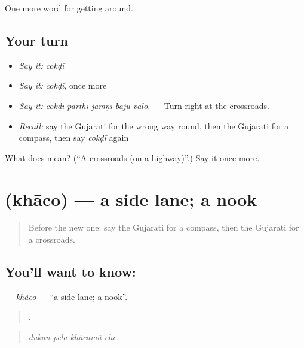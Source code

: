 \begin{grammarlens}[title={What you've built}]
One more word for getting around.
\end{grammarlens}

\subsection*{Your turn}
\begin{itemize}
\raggedright
  \item \emph{Say it:} \emph{cokḍī}
  \item \emph{Say it:} \emph{cokḍī}, once more
  \item \emph{Say it:} \emph{cokḍī parthī jamṇī bāju vaḷo.} — Turn right at the crossroads.
  \item \emph{Recall:} say the Gujarati for the wrong way round, then the Gujarati for a compass, then say \emph{cokḍī} again
\end{itemize}

\begin{tcolorbox}[breakable,colback=teal!4,colframe=teal!35!black,title={Before you move on}]
What does  mean? (\textquotedblleft{}A crossroads (on a highway)\textquotedblright{}.) Say it once more.
\end{tcolorbox}
\section[\texorpdfstring{\gu{ખાંચો} (khā̃co)}{ખાંચો (khā̃co)}]{ (khā̃co) — a side lane; a nook}

\label{lesson:GU-C415-khaco}



\begin{quote}
Before the new one: say the Gujarati for a compass, then the Gujarati for a crossroads.
\end{quote}

\subsection*{You'll want to know: }
\textbf{} — \emph{khā̃co} — \textquotedblleft{}a side lane; a nook\textquotedblright{}.

\begin{quote}
   .
\end{quote}

\begin{quote}
\emph{dukān pelā khā̃cāmā̃ che.}
\end{quote}

